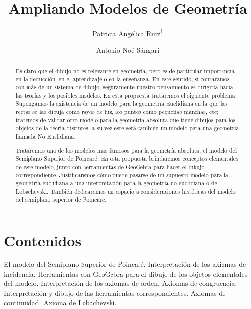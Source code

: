 \documentclass[oneside,spanish]{amsart}
\numberwithin{equation}{section}
\numberwithin{figure}{section}
\theoremstyle{definition}
\begin{document}
	
\title{Ampliando Modelos de Geometría\vspace{-2ex}}
\author[1]{Patricia Angélica Ruiz\textsuperscript{1}}
\author[2]{Antonio Noé Sángari}

\begin{abstract}
Es claro que el dibujo no es relevante en geometría, pero es de particular importancia en la deducción, en el aprendizaje o en la enseñanza. En este sentido, si contáramos con más de un sistema de dibujo, seguramente nuestro pensamiento se dirigiría hacia las teorías y los posibles modelos. En esta propuesta trataremos el siguiente problema: Supongamos la existencia de un modelo para la geometría Euclidiana en la que las rectas se las dibuja como rayos de luz, los puntos como pequeñas manchas, etc; tratemos de validar otro modelo para la geometría absoluta que tiene dibujos para los objetos de la teoría distintos, a su vez este será también un modelo para una geometría llamada No Euclidiana.

Trataremos uno de los modelos más famosos para la geometría absoluta, el modelo del Semiplano Superior de Poincaré. En esta propuesta brindaremos conceptos elementales de este modelo, junto con herramientas de GeoGebra para hacer el dibujo correspondiente. Justificaremos cómo puede pasarse de un supuesto modelo para la geometría euclidiana a una interpretación para la geometría no euclidiana o de Lobachevski. También dedicaremos un espacio a consideraciones históricas del modelo del semiplano superior de Poincaré. 
\end{abstract}

\maketitle
\thispagestyle{empty}

\section{Contenidos}

El modelo del Semiplano Superior de Poincaré. Interpretación de los axiomas de incidencia. Herramientas con GeoGebra para el dibujo de los objetos elementales del modelo. Interpretación de los axiomas de orden. Axiomas de congruencia. Interpretación y dibujo de las herramientas correspondientes. Axiomas de continuidad. Axioma de Lobachevski.
\end{document}
